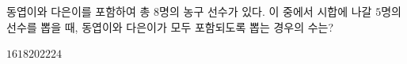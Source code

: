 \hspace*{2mm}\begin{minipage}[t]{\dimexpr\linewidth-2mm\relax}\vspace{0pt}
동엽이와 다은이를 포함하여 총 $8$명의 농구 선수가 있다. 이 중에서 시합에 나갈 $5$명의 선수를 뽑을 때, 동엽이와 다은이가 모두 포함되도록 뽑는 경우의 수는?
\begin{choices32}{$16$}{$18$}{$20$}{$22$}{$24$}\end{choices32}\end{minipage}
